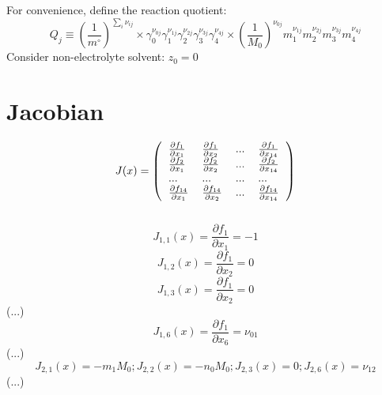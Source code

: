\documentclass[onecolumn]{article}
\begin{document}
For convenience, define the reaction quotient:\\
\begin{equation}
\label{eq:reaction_quotient}
Q_j \equiv \left(\frac{1}{m^{\circ}}\right)^{\sum_i{\nu_{ij}}}\times
\gamma_0^{\nu_{0j}}\gamma_1^{\nu_{1j}}\gamma_2^{\nu_{2j}}
\gamma_3^{\nu_{3j}}\gamma_4^{\nu_{4j}}\times
\left(\frac{1}{M_0}\right)^{\nu_{0j}}m_1^{\nu_{1j}}m_2^{\nu_{2j}}
m_3^{\nu_{3j}}m_4^{\nu_{4j}}
\end{equation}
Consider non-electrolyte solvent: $z_0 = 0$
\section{Jacobian}
\[
J(x) = \left(
\begin{tabular}{llll}
$\frac{\partial{f_1}}{\partial{x_1}}$ &
$\frac{\partial{f_1}}{\partial{x_2}}$ & ... &
$\frac{\partial{f_1}}{\partial{x_{14}}}$\\
$\frac{\partial{f_2}}{\partial{x_1}}$ &
$\frac{\partial{f_2}}{\partial{x_2}}$ & ... &
$\frac{\partial{f_2}}{\partial{x_{14}}}$\\
$...$ & $...$ & $...$ & $...$\\
$\frac{\partial{f_{14}}}{\partial{x_1}}$ &
$\frac{\partial{f_{14}}}{\partial{x_2}}$ & ... &
$\frac{\partial{f_{14}}}{\partial{x_{14}}}$\\
\end{tabular}
\right)
\]\\
\[
J_{1,1}(x) = \frac{\partial{f_{1}}}{\partial{x_1}} =  -1
\]
\[
J_{1,2}(x) = \frac{\partial{f_{1}}}{\partial{x_2}} =  0
\]
\[
J_{1,3}(x) = \frac{\partial{f_{1}}}{\partial{x_2}} =  0
\]
(...)
\[
J_{1,6}(x) = \frac{\partial{f_{1}}}{\partial{x_6}} =  \nu_{01}
\]
(...)
\[
J_{2,1}(x) =  -m_1 M_0;
J_{2,2}(x) =  -n_0 M_0;
J_{2,3}(x) =  0;
J_{2,6}(x) = \nu_{12}
\]
(...)
\end{document}
